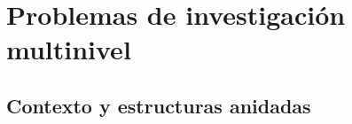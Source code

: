 \documentclass[]{beamer} %
\begin{document}
\section{Problemas de investigación multinivel}

\begin{frame}%

	\begin{minipage}{\textwidth} %
	\end{minipage}
\end{frame}

\subsection{Contexto y estructuras anidadas}
\end{document}
